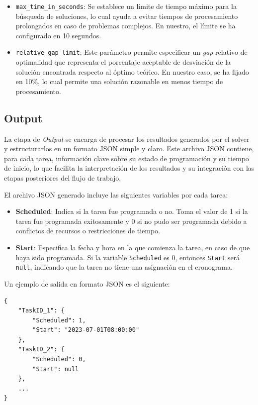 \documentclass{article}
\begin{document}
\begin{itemize}
    \item \texttt{max\_time\_in\_seconds}: Se establece un límite de tiempo máximo para la búsqueda de soluciones, lo cual ayuda a evitar tiempos de procesamiento prolongados en caso de problemas complejos. En nuestro, el límite se ha configurado en 10 segundos.

    \item \texttt{relative\_gap\_limit}: Este parámetro permite especificar un \textit{gap} relativo de optimalidad que representa el porcentaje aceptable de desviación de la solución encontrada respecto al óptimo teórico. En nuestro caso, se ha fijado en 10\%, lo cual permite una solución razonable en menos tiempo de procesamiento.
\end{itemize}


\subsection{Output}

La etapa de \textit{Output} se encarga de procesar los resultados generados por el solver y estructurarlos en un formato JSON simple y claro. Este archivo JSON contiene, para cada tarea, información clave sobre su estado de programación y su tiempo de inicio, lo que facilita la interpretación de los resultados y su integración con las etapas posteriores del flujo de trabajo.

El archivo JSON generado incluye las siguientes variables por cada tarea:

\begin{itemize}
    \item \textbf{Scheduled}: Indica si la tarea fue programada o no. Toma el valor de 1 si la tarea fue programada exitosamente y 0 si no pudo ser programada debido a conflictos de recursos o restricciones de tiempo.
    
    \item \textbf{Start}: Especifica la fecha y hora en la que comienza la tarea, en caso de que haya sido programada. Si la variable \texttt{Scheduled} es 0, entonces \texttt{Start} será \texttt{null}, indicando que la tarea no tiene una asignación en el cronograma.
\end{itemize}

Un ejemplo de salida en formato JSON es el siguiente:

\begin{verbatim}
{
    "TaskID_1": {
        "Scheduled": 1,
        "Start": "2023-07-01T08:00:00"
    },
    "TaskID_2": {
        "Scheduled": 0,
        "Start": null
    },
    ...
}
\end{verbatim}
\end{document}
